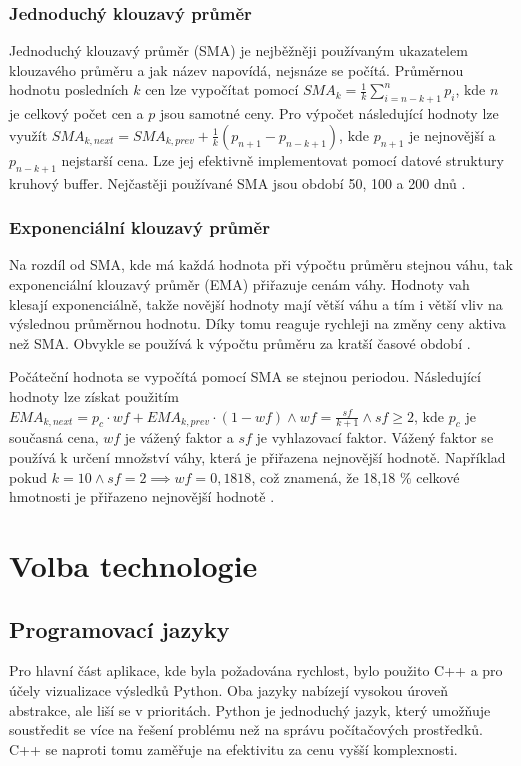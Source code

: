 \subsection{Jednoduchý klouzavý průměr}
Jednoduchý klouzavý průměr (SMA) je nejběžněji používaným ukazatelem klouzavého průměru a jak název napovídá, nejsnáze se počítá.
Průměrnou hodnotu posledních $k$ cen lze vypočítat pomocí $SMA_k = \frac{1}{k}\sum_{i=n-k+1}^{n} p_i$, kde $n$ je celkový počet cen a $p$ jsou samotné ceny.
Pro výpočet následující hodnoty lze využít $SMA_{k,next}=SMA_{k,prev}+\frac{1}{k}(p_{n+1}-p_{n-k+1})$, kde $p_{n+1}$ je nejnovější a $p_{n-k+1}$ nejstarší cena.
Lze jej efektivně implementovat pomocí datové struktury kruhový buffer.
Nejčastěji používané SMA jsou období 50, 100 a 200 dnů \cite{ma-algorithms, sma-wiki}.


\subsection{Exponenciální klouzavý průměr}
Na rozdíl od SMA, kde má každá hodnota při výpočtu průměru stejnou váhu, tak exponenciální klouzavý průměr (EMA) přiřazuje cenám váhy.
Hodnoty vah klesají exponenciálně, takže novější hodnoty mají větší váhu a tím i větší vliv na výslednou průměrnou hodnotu.
Díky tomu reaguje rychleji na změny ceny aktiva než SMA.
Obvykle se používá k výpočtu průměru za kratší časové období \cite{ma-algorithms, ema-institute}.

Počáteční hodnota se vypočítá pomocí SMA se stejnou periodou.
Následující hodnoty lze získat použitím
$EMA_{k, next} = p_c \cdot wf + EMA_{k, prev} \cdot (1-wf) \land wf=\frac{sf}{k+1} \land sf\geq2$, kde $p_c$ je současná cena, $wf$ je vážený faktor a $sf$ je vyhlazovací faktor.
Vážený faktor se používá k určení množství váhy, která je přiřazena nejnovější hodnotě.
Například pokud $k=10 \land sf=2 \implies wf = 0,1818$, což znamená, že 18,18 \% celkové hmotnosti je přiřazeno nejnovější hodnotě \cite{ma-stockcharts}.

\chapter{Volba technologie}
\section{Programovací jazyky}
Pro hlavní část aplikace, kde byla požadována rychlost, bylo použito C++ a pro účely vizualizace výsledků Python.
Oba jazyky nabízejí vysokou úroveň abstrakce, ale liší se v prioritách.
Python je jednoduchý jazyk, který umožňuje soustředit se více na řešení problému než na správu počítačových prostředků.
C++ se naproti tomu zaměřuje na efektivitu za cenu vyšší komplexnosti.


